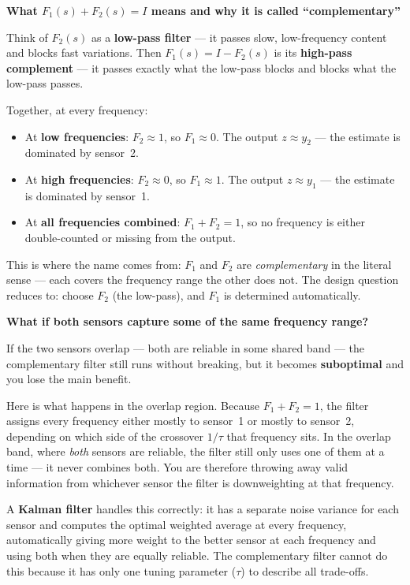 \documentclass[12pt, a4paper]{article}
\begin{document}
\begin{notebox}
  \textbf{What $F_1(s) + F_2(s) = I$ means and why it is called
  ``complementary''}

  Think of $F_2(s)$ as a \textbf{low-pass filter} --- it passes slow,
  low-frequency content and blocks fast variations.
  Then $F_1(s) = I - F_2(s)$ is its \textbf{high-pass complement} ---
  it passes exactly what the low-pass blocks and blocks what the low-pass
  passes.

  Together, at every frequency:
  \begin{itemize}[leftmargin=1.2em, itemsep=2pt]
    \item At \textbf{low frequencies}: $F_2 \approx 1$, so $F_1 \approx 0$.
      The output $z \approx y_2$ --- the estimate is dominated by sensor~2.
    \item At \textbf{high frequencies}: $F_2 \approx 0$, so $F_1 \approx 1$.
      The output $z \approx y_1$ --- the estimate is dominated by sensor~1.
    \item At \textbf{all frequencies combined}: $F_1 + F_2 = 1$, so no
      frequency is either double-counted or missing from the output.
  \end{itemize}

  This is where the name comes from: $F_1$ and $F_2$ are
  \emph{complementary} in the literal sense --- each covers the frequency
  range the other does not.
  The design question reduces to: choose $F_2$ (the low-pass), and $F_1$
  is determined automatically.

  \textbf{What if both sensors capture some of the same frequency range?}

  If the two sensors overlap --- both are reliable in some shared band ---
  the complementary filter still runs without breaking, but it becomes
  \textbf{suboptimal} and you lose the main benefit.

  Here is what happens in the overlap region.
  Because $F_1 + F_2 = 1$, the filter assigns every frequency either mostly
  to sensor~1 or mostly to sensor~2, depending on which side of the crossover
  $1/\tau$ that frequency sits.
  In the overlap band, where \emph{both} sensors are reliable, the filter
  still only uses one of them at a time --- it never combines both.
  You are therefore throwing away valid information from whichever sensor
  the filter is downweighting at that frequency.

  A \textbf{Kalman filter} handles this correctly: it has a separate noise
  variance for each sensor and computes the optimal weighted average at every
  frequency, automatically giving more weight to the better sensor at each
  frequency and using both when they are equally reliable.
  The complementary filter cannot do this because it has only one tuning
  parameter ($\tau$) to describe all trade-offs.


\end{notebox}
\end{document}
